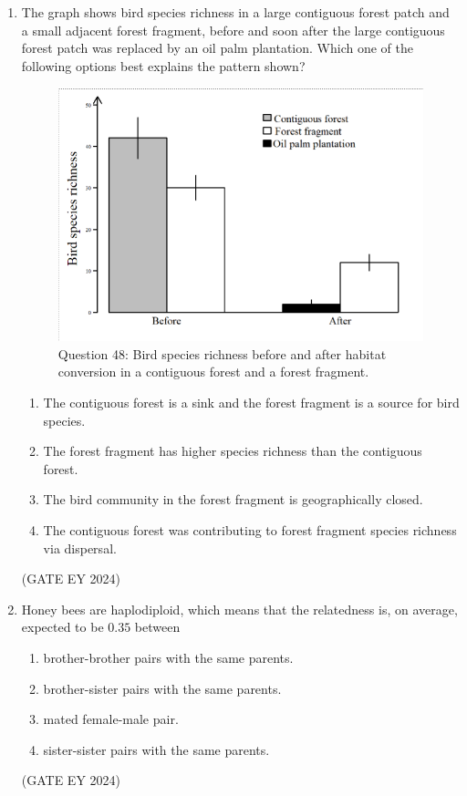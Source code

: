 \documentclass[journal]{IEEEtran}
\begin{document}
\begin{enumerate}
\item The graph shows bird species richness in a large contiguous forest patch and a small adjacent forest fragment, before and soon after the large contiguous forest patch was replaced by an oil palm plantation. Which one of the following options best explains the pattern shown?
\begin{figure}[!ht]
    \centering
    \includegraphics[width=0.8\columnwidth]{figs/Q-48.png}
    \caption{Question 48: Bird species richness before and after habitat conversion in a contiguous forest and a forest fragment.}
    \label{Q.48}
\end{figure}
    \begin{enumerate}
        \item The contiguous forest is a sink and the forest fragment is a source for bird species.
        \item The forest fragment has higher species richness than the contiguous forest.
        \item The bird community in the forest fragment is geographically closed.
        \item The contiguous forest was contributing to forest fragment species richness via dispersal.
    \end{enumerate}
\hfill{(GATE EY 2024)}

\item Honey bees are haplodiploid, which means that the relatedness is, on average, expected to be $0.35$ between
    \begin{enumerate}
        \item brother-brother pairs with the same parents.
        \item brother-sister pairs with the same parents.
        \item mated female-male pair.
        \item sister-sister pairs with the same parents.
    \end{enumerate}
\hfill{(GATE EY 2024)}


\end{enumerate}
\end{document}
